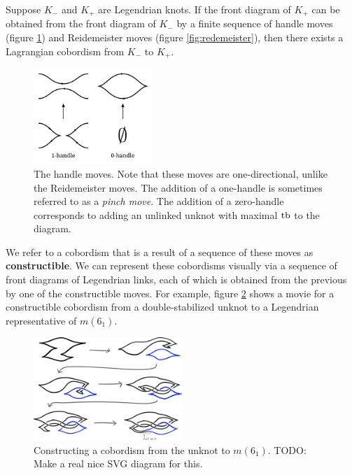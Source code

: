 \begin{theorem}
    Suppose $K_-$ and $K_+$ are Legendrian knots. If the front diagram of $K_+$ can be obtained from the front diagram of $K_-$ by a finite sequence of handle moves (figure \ref{fig:handles}) and Reidemeister moves (figure \ref{fig:redemeister}), then there exists a Lagrangian cobordism from $K_-$ to $K_+$. 
\end{theorem}
\begin{figure}[ht!]
    \centering
    \includegraphics[width=0.4\textwidth]{images/handles.pdf}
    \caption{The handle moves. Note that these moves are one-directional, unlike the Reidemeister moves. The addition of a one-handle is sometimes referred to as a \emph{pinch move}. The addition of a zero-handle corresponds to adding an unlinked unknot with maximal $\operatorname{tb}$ to the diagram.}
    \label{fig:handles}
\end{figure}

We refer to a cobordism that is a result of a sequence of these moves as \textbf{constructible}. We can represent these cobordisms visually via a sequence of front diagrams of Legendrian links, each of which is obtained from the previous by one of the constructible moves. For example, figure \ref{fig:cobordism-construction} shows a movie for a constructible cobordism from a double-stabilized unknot to a Legendrian representative of $m(6_1)$.

\begin{figure}[ht!]
    \centering
    \includegraphics[width=0.5\textwidth]{images/cobordism-construction.png}
    \caption{Constructing a cobordism from the unknot to $m(6_1)$.
    TODO: Make a real nice SVG diagram for this.}%
    \label{fig:cobordism-construction}
\end{figure}

